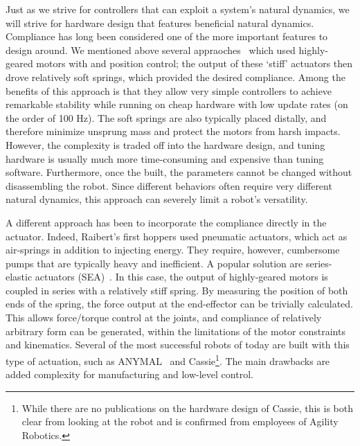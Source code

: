 Just as we strive for controllers that can exploit a system's natural dynamics, we will strive for hardware design that features beneficial natural dynamics.
Compliance has long been considered one of the more important features to design around.
We mentioned above several appraoches~\cite{sprowitz2013towards,buchli2006resonance,altendorfer2001rhex,owaki2013simple} which used highly-geared motors with and position control; the output of these `stiff' actuators then drove relatively soft springs, which provided the desired compliance. Among the benefits of this approach is that they allow very simple controllers to achieve remarkable stability while running on cheap hardware with low update rates (on the order of 100 Hz). The soft springs are also typically placed distally, and therefore minimize unsprung mass and protect the motors from harsh impacts. However, the complexity is traded off into the hardware design, and tuning hardware is usually much more time-consuming and expensive than tuning software. Furthermore, once the built, the parameters cannot be changed without disassembling the robot. Since different behaviors often require very different natural dynamics, this approach can severely limit a robot's versatility. \par
A different approach has been to incorporate the compliance directly in the actuator. Indeed, Raibert's first hoppers used pneumatic actuators, which act as air-springs in addition to injecting energy. They require, however, cumbersome pumps that are typically heavy and inefficient.
A popular solution are series-elastic actuators (SEA)~\cite{pratt1995series}. In this case, the output of highly-geared motors is coupled in series with a relatively stiff spring. By measuring the position of both ends of the spring, the force output at the end-effector can be trivially calculated. This allows force/torque control at the joints, and compliance of relatively arbitrary form can be generated, within the limitations of the motor constraints and kinematics. Several of the most successful robots of today are built with this type of actuation, such as ANYMAL~\cite{hutter2016anymal} and Cassie\footnote{While there are no publications on the hardware design of Cassie, this is both clear from looking at the robot and is confirmed from employees of Agility Robotics.}. The main drawbacks are added complexity for manufacturing and low-level control.
